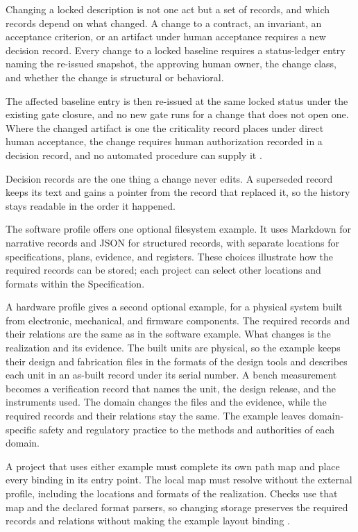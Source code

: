 Changing a locked description is not one act but a set of records, and which records depend on what changed. A change to a contract, an invariant, an acceptance criterion, or an artifact under human acceptance requires a new decision record. Every change to a locked baseline requires a status-ledger entry naming the re-issued snapshot, the approving human owner, the change class, and whether the change is structural or behavioral.

The affected baseline entry is then re-issued at the same locked status under the existing gate closure, and no new gate runs for a change that does not open one. Where the changed artifact is one the criticality record places under direct human acceptance, the change requires human authorization recorded in a decision record, and no automated procedure can supply it \citep[Sections~\hyperlink{nss-9.2}{9.2} and~\hyperlink{nss-7.19}{7.19}]{pss2026}.

Decision records are the one thing a change never edits. A superseded record keeps its text and gains a pointer from the record that replaced it, so the history stays readable in the order it happened.

The software profile offers one optional filesystem example. It uses Markdown for narrative records and JSON for structured records, with separate locations for specifications, plans, evidence, and registers. These choices illustrate how the required records can be stored; each project can select other locations and formats within the Specification.

A hardware profile gives a second optional example, for a physical system built from electronic, mechanical, and firmware components. The required records and their relations are the same as in the software example. What changes is the realization and its evidence. The built units are physical, so the example keeps their design and fabrication files in the formats of the design tools and describes each unit in an as-built record under its serial number. A bench measurement becomes a verification record that names the unit, the design release, and the instruments used. The domain changes the files and the evidence, while the required records and their relations stay the same. The example leaves domain-specific safety and regulatory practice to the methods and authorities of each domain.

A project that uses either example must complete its own path map and place every binding in its entry point. The local map must resolve without the external profile, including the locations and formats of the realization. Checks use that map and the declared format parsers, so changing storage preserves the required records and relations without making the example layout binding \citep[Section~\hyperlink{nss-14.8}{14.8}]{pss2026}.

